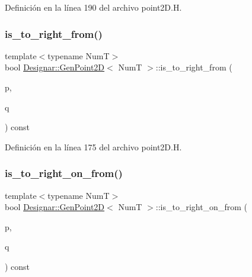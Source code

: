 Definición en la línea 190 del archivo point2\+D.\+H.

\mbox{\label{class_designar_1_1_gen_point2_d_acb12e43d036b0a5719af3887814a2684}} 
\subsubsection{\texorpdfstring{is\+\_\+to\+\_\+right\+\_\+from()}{is\_to\_right\_from()}}
{\footnotesize\ttfamily template$<$typename NumT$>$ \\
bool \hyperlink{class_designar_1_1_gen_point2_d}{Designar\+::\+Gen\+Point2D}$<$ NumT $>$\+::is\+\_\+to\+\_\+right\+\_\+from (\begin{DoxyParamCaption}\item[{const \hyperlink{class_designar_1_1_gen_point2_d}{Gen\+Point2D}$<$ NumT $>$ \&}]{p,  }\item[{const \hyperlink{class_designar_1_1_gen_point2_d}{Gen\+Point2D}$<$ NumT $>$ \&}]{q }\end{DoxyParamCaption}) const\hspace{0.3cm}{\ttfamily [inline]}}



Definición en la línea 175 del archivo point2\+D.\+H.

\mbox{\label{class_designar_1_1_gen_point2_d_ac8980c31c7c8075510e3e74f4358b305}} 
\subsubsection{\texorpdfstring{is\+\_\+to\+\_\+right\+\_\+on\+\_\+from()}{is\_to\_right\_on\_from()}}
{\footnotesize\ttfamily template$<$typename NumT$>$ \\
bool \hyperlink{class_designar_1_1_gen_point2_d}{Designar\+::\+Gen\+Point2D}$<$ NumT $>$\+::is\+\_\+to\+\_\+right\+\_\+on\+\_\+from (\begin{DoxyParamCaption}\item[{const \hyperlink{class_designar_1_1_gen_point2_d}{Gen\+Point2D}$<$ NumT $>$ \&}]{p,  }\item[{const \hyperlink{class_designar_1_1_gen_point2_d}{Gen\+Point2D}$<$ NumT $>$ \&}]{q }\end{DoxyParamCaption}) const\hspace{0.3cm}{\ttfamily [inline]}}



